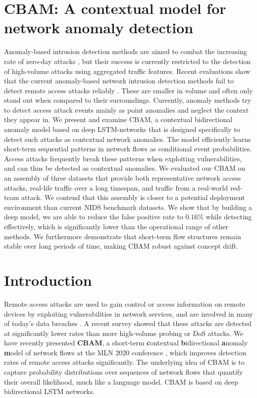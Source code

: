 \section{CBAM: A contextual model for network anomaly detection}


Anomaly-based intrusion detection methods are aimed to combat the increasing rate of zero-day  attacks \cite{zeroday}, but their success is currently restricted to the detection of high-volume attacks using aggregated traffic features. Recent evaluations show that the current anomaly-based network intrusion detection methods fail to detect remote access attacks reliably \cite{nisioti2018intrusion}. These are smaller in volume and often only stand out when compared to their surroundings. Currently, anomaly methods try to detect access attack events mainly as point anomalies and neglect the context they appear in.
We present and examine CBAM, a contextual bidirectional anomaly model based on deep LSTM-networks that is designed specifically to detect such attacks as contextual network anomalies. The model efficiently learns short-term sequential patterns in network flows as conditional event probabilities. Access attacks frequently break these patterns when exploiting vulnerabilities, and can thus be detected as contextual anomalies. 
We evaluated our CBAM on an assembly of three datasets that provide both representative network access attacks, real-life traffic over a long timespan, and traffic from a real-world red-team attack. We contend that this assembly is closer to a potential deployment environment than current NIDS benchmark datasets. We show that by building a deep model, we are able to reduce the false positive rate to $0.16\%$ while detecting effectively, which is significantly lower than the operational range of other methods. We furthermore demonstrate that short-term flow structures remain stable over long periods of time, making CBAM robust against concept drift.


\section{Introduction}





Remote access attacks are used to gain control or access information on remote devices by exploiting vulnerabilities in network services, and are involved in many of today's data breaches \cite{mandiant2015trends}.
A recent survey \cite{nisioti2018intrusion} showed that these attacks are detected at significantly lower rates than more high-volume probing or DoS attacks. 
We have recently presented \textbf{CBAM}, a short-term \textbf{c}ontextual \textbf{b}idirectional \textbf{a}nomaly \textbf{m}odel of network flows at the MLN 2020 conference \cite{clausen2021better}, which improves detection rates of remote access attacks significantly. The underlying idea of CBAM is to capture probability distributions over sequences of network flows that quantify their overall likelihood, much like a language model. 
CBAM is based on deep bidirectional LSTM networks. 

